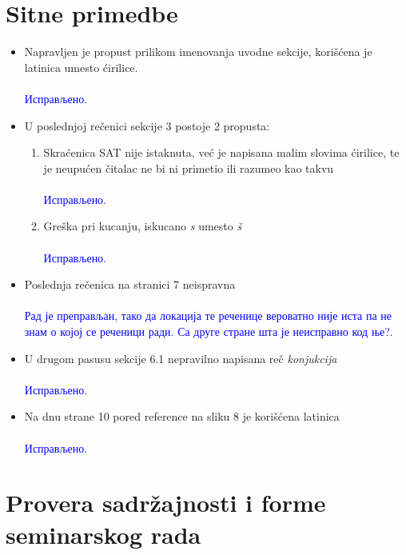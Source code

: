\documentclass[a4paper]{report}
\newcommand{\odgovor}[1]{\textcolor{blue}{#1}}
\newcommand{\say}[1]{\textit{#1}}
\begin{document}
\section{Sitne primedbe}
\begin{itemize}
 \item Napravljen je propust prilikom imenovanja uvodne sekcije, korišćena je latinica umesto ćirilice.
     \\\\
    \odgovor{Исправљено.} 
	\\
 \item U poslednjoj rečenici sekcije 3 postoje 2 propusta:
 	\begin{enumerate}
 		\item Skraćenica SAT nije istaknuta, već je napisana malim slovima ćirilice, te je neupućen čitalac ne bi ni primetio ili razumeo kao takvu
     \\\\
    \odgovor{Исправљено.} 
	\\
 		\item Greška pri kucanju, iskucano \say{s} umesto \say{š}
     \\\\
    \odgovor{Исправљено.} 
	\\
 	\end{enumerate}
 \item Poslednja rečenica na stranici 7 neispravna
 \\\\
    \odgovor{Рад је преправљан, тако да локација те реченице вероватно није иста па не знам о којој се реченици ради. Са друге стране шта је неисправно код ње?.} 
	\\
 \item U drugom pasusu sekcije 6.1 nepravilno napisana reč \say{konjukcija}
    \\\\
    \odgovor{Исправљено.} 
	\\
 \item Na dnu strane 10 pored reference na sliku 8 je korišćena latinica
      \\\\
    \odgovor{Исправљено.} 
	\\
\end{itemize}

\section{Provera sadržajnosti i forme seminarskog rada}
\end{document}
